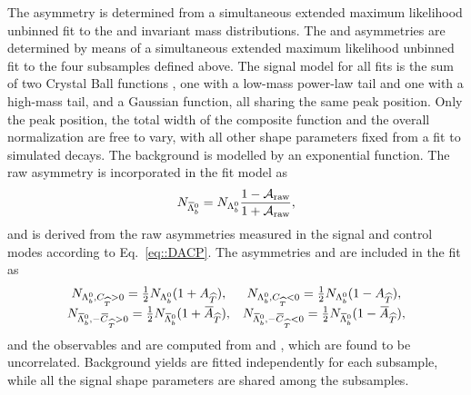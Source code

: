 The asymmetry \Araw is determined from a simultaneous extended maximum likelihood unbinned fit to the \Lb and \Lbbar invariant mass distributions. The \AT and \ATbar asymmetries are determined by means of a simultaneous extended maximum likelihood unbinned fit to the four subsamples defined above.
The signal model for all fits is the sum of two Crystal Ball functions \cite{Skwarnicki:1986xj}, one with a low-mass power-law tail and one with a high-mass tail, and a Gaussian function, all sharing the same peak position. Only the peak position, the total width of the composite function and the overall normalization are free to vary, with all other shape parameters fixed from a fit to simulated decays. The background is modelled by an exponential function. The raw asymmetry \Araw is incorporated in the fit model as
\begin{equation}
N_{{{\kern 0.1em\overline{\kern -0.1em\Lambda}}{}^0_{b}}} = N_{{{\Lambda}^0_{b}}} \frac{1-\mathcal{A}_{\text{raw}}}{1+\mathcal{A}_{\text{raw}}},
\label{eq::Lbbaryield}
\end{equation}
and \DACP is derived from the raw asymmetries measured in the signal and control modes according to Eq.~\ref{eq::DACP}. The asymmetries \AT and \ATbar are included in the fit as
\def\arraystretch{1.8}
\begin{equation}
\begin{array}{cc}
N_{{{\Lambda}^0_{b}},{C_{\widehat{T}}}>0} = \frac{1}{2} N_{{{\Lambda}^0_{b}}} (1+{A_{\widehat{T}}}), & N_{{{\Lambda}^0_{b}},{C_{\widehat{T}}}<0} = \frac{1}{2} N_{{{\Lambda}^0_{b}}} (1-{A_{\widehat{T}}}),\\
N_{{{\kern 0.1em\overline{\kern -0.1em\Lambda}}{}^0_{b}},-{\kern 0.1em\overline{\kern -0.1em C}_{\widehat{T}}}>0} = \frac{1}{2} N_{{{\kern 0.1em\overline{\kern -0.1em\Lambda}}{}^0_{b}}} (1+{\kern 0.1em\overline{\kern -0.1em A}_{\widehat{T}}}), & N_{{{\kern 0.1em\overline{\kern -0.1em\Lambda}}{}^0_{b}},-{\kern 0.1em\overline{\kern -0.1em C}_{\widehat{T}}}<0} = \frac{1}{2} N_{{{\kern 0.1em\overline{\kern -0.1em\Lambda}}{}^0_{b}}} (1-{\kern 0.1em\overline{\kern -0.1em A}_{\widehat{T}}}),\\
\end{array}
\end{equation}
and the observables \ACP and \aPTodd are computed from \AT and \ATbar, which are found to be uncorrelated. Background yields are fitted independently for each subsample, while all the signal shape parameters are shared among the subsamples.

